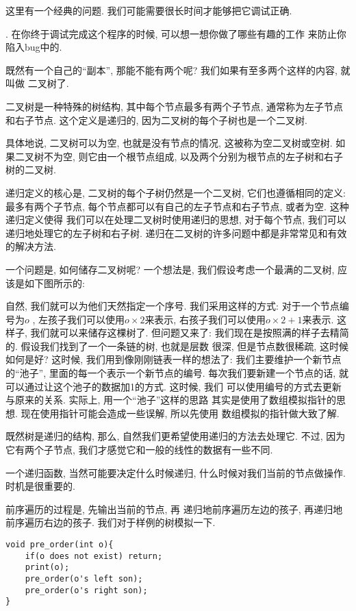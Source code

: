 这里有一个经典的问题. 我们可能需要很长时间才能够把它调试正确. 

. 在你终于调试完成这个程序的时候, 可以想一想你做了哪些有趣的工作
来防止你陷入bug中的. 



既然有一个自己的``副本'', 那能不能有两个呢? 我们如果有至多两个这样的内容, 就叫做
二叉树了. 

二叉树是一种特殊的树结构, 其中每个节点最多有两个子节点, 通常称为左子节点和右子节点. 
这个定义是递归的, 因为二叉树的每个子树也是一个二叉树. 

具体地说, 二叉树可以为空, 也就是没有节点的情况, 这被称为空二叉树或空树. 
如果二叉树不为空, 则它由一个根节点组成, 以及两个分别为根节点的左子树和右子树的二叉树. 

递归定义的核心是, 二叉树的每个子树仍然是一个二叉树, 它们也遵循相同的定义: 
最多有两个子节点, 每个节点都可以有自己的左子节点和右子节点, 或者为空. 这种递归定义使得
我们可以在处理二叉树时使用递归的思想, 对于每个节点, 
我们可以递归地处理它的左子树和右子树. 递归在二叉树的许多问题中都是非常常见和有效的解决方法. 

一个问题是, 如何储存二叉树呢? 一个想法是, 我们假设考虑一个最满的二叉树, 应该是如下图所示的: 

自然, 我们就可以为他们天然指定一个序号. 我们采用这样的方式: 对于一个节点编号为$o$
, 左孩子我们可以使用$o\times 2$来表示, 右孩子我们可以使用$o\times 2+1$来表示. 
这样子, 我们就可以来储存这棵树了. 
但问题又来了: 我们现在是按照满的样子去精简的. 假设我们找到了一个一条链的树, 也就是层数
很深, 但是节点数很稀疏, 这时候如何是好? 这时候, 我们用到像刚刚链表一样的想法了:
我们主要维护一个新节点的``池子'', 里面的每一个表示一个新节点的编号.
每次我们要新建一个节点的话, 就可以通过让这个池子的数据加1的方式. 这时候, 我们 
可以使用编号的方式去更新与原来的关系. 实际上, 用一个``池子''这样的思路
其实是使用了数组模拟指针的思想. 现在使用指针可能会造成一些误解, 所以先使用
数组模拟的指针做大致了解. 

既然树是递归的结构, 那么, 自然我们更希望使用递归的方法去处理它. 不过, 
因为它有两个子节点, 我们才感觉它和一般的线性的数据有一些不同. 

一个递归函数, 当然可能要决定什么时候递归, 什么时候对我们当前的节点做操作. 
时机是很重要的. 

 前序遍历的过程是, 先输出当前的节点, 再
递归地前序遍历左边的孩子, 再递归地前序遍历右边的孩子. 我们对于样例的树模拟一下. 
\begin{lstlisting}
void pre_order(int o){
    if(o does not exist) return;
    print(o);
    pre_order(o's left son);
    pre_order(o's right son);
}
\end{lstlisting}

